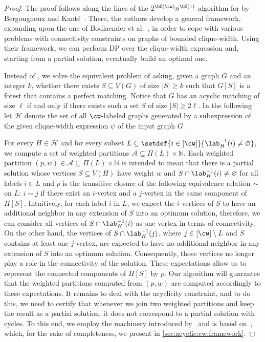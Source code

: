 \begin{proof}
    The proof follows along the lines of the $2^{\bO(\cw)} n^{\bO(1)}$ algorithm for {\FVS} by Bergougnoux and Kant\'e~\cite{tcs/BergougnouxK19}.
    There, the authors develop a general framework, expanding upon the one of Bodlaender et al.~\cite{iandc/BodlaenderCKN15},
    in order to cope with various problems with connectivity constraints on graphs of bounded clique-width.
    Using their framework, we can perform DP over the clique-width expression and, starting from a partial solution,
    eventually build an optimal one.

    Instead of \AcyclicM, we solve the equivalent problem of asking,
    given a graph $G$ and an integer $k$, whether there exists $S \subseteq V(G)$ of size $|S| \ge k$ such that
    $G[S]$ is a forest that contains a perfect matching.
    Notice that $G$ has an acyclic matching of size $\ell$ if and only if there exists such a set $S$
    of size $|S| \ge 2\ell$.
    In the following let $\mathcal{H}$ denote the set of all $\cw$-labeled graphs generated
    by a subexpression of the given clique-width expression $\psi$ of the input graph $G$.

    For every $H \in \mathcal{H}$ and for every subset $L \subseteq \setdef{i \in [\cw]}{\lab^{-1}_H(i) \neq \varnothing}$,
    we compute a set of weighted partitions $\mathcal{A} \subseteq \Pi(L) \times \mathbb{N}$.
    Each weighted partition $(p,w) \in \mathcal{A} \subseteq \Pi(L) \times \mathbb{N}$ is intended to mean that
    there is a partial solution whose vertices $S \subseteq V(H)$ have weight $w$ and $S \cap \lab^{-1}_H(i) \neq \varnothing$
    for all labels $i \in L$ and $p$ is the transitive closure of the following equivalence relation $\sim$ on $L$:
    $i \sim j$ if there exist an $i$-vertex and a $j$-vertex in the same component of $H[S]$.
    Intuitively, for each label $i$ in $L$, we expect the $i$-vertices of $S$ to have an additional neighbor in any
    extension of $S$ into an optimum solution, therefore, we can consider all vertices of $S \cap \lab^{-1}_H(i)$ as
    one vertex in terms of connectivity.
    On the other hand, the vertices of $S \cap \lab^{-1}_H(j)$, where $j \in [\cw] \setminus L$ and $S$ contains at least one $j$-vertex,
    are expected to have no additional neighbor in any extension of $S$ into an optimum solution.
    Consequently, those vertices no longer play a role in the connectivity of the solution.
    These expectations allow us to represent the connected components of $H[S]$ by $p$.
    Our algorithm will guarantee that the weighted partitions computed from $(p,w)$ are computed accordingly to these expectations.
    It remains to deal with the acyclicity constraint, and to do this,
    we need to certify that whenever we join two weighted partitions and keep the result as a partial solution,
    it does not correspond to a partial solution with cycles.
    To this end, we employ the machinery introduced by~\cite{tcs/BergougnouxK19} and is based on~\cite{iandc/BodlaenderCKN15},
    which, for the sake of completeness, we present in \cref{sec:acyclic:cw:framework}.


\end{proof}

